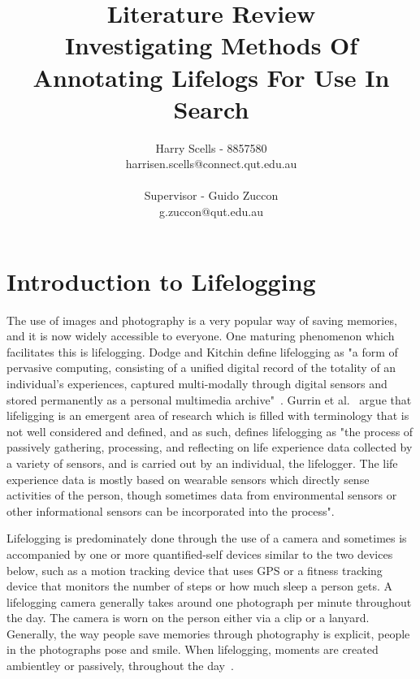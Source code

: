 \documentclass[12pt,a4paper]{article}
\begin{document}
\title{\small Literature Review\\\huge Investigating Methods Of Annotating Lifelogs For Use In Search}

\author{Harry Scells - 8857580\\harrisen.scells@connect.qut.edu.au\\\\\small Supervisor - Guido Zuccon\\\small g.zuccon@qut.edu.au\\}
\maketitle
\pagebreak
\tableofcontents
\pagebreak
\section{Introduction to Lifelogging}
The use of images and photography is a very popular way of saving memories, and it is now widely accessible to everyone. One maturing phenomenon which facilitates this is lifelogging. Dodge and Kitchin define lifelogging as "a form of pervasive computing, consisting of a unified digital record of the totality of  an individual's experiences, captured multi-modally through digital sensors and stored permanently as a personal multimedia archive"~\cite{dodge2007outlines}. Gurrin et al.~\cite{gurrin2014lifelogging} argue that lifeligging is an emergent area of research which is filled with terminology that is not well considered and defined, and as such, defines lifelogging as "the process of passively gathering, processing, and reflecting on life experience data collected by a variety of sensors, and is carried out by an individual, the lifelogger. The life experience data is mostly based on wearable sensors which directly sense activities of the person, though sometimes data from environmental sensors or other informational sensors can be incorporated into the process".

 Lifelogging is predominately done through the use of a camera and sometimes is accompanied by one or more quantified-self devices similar to the two devices below, such as a motion tracking device that uses GPS or a fitness tracking device that monitors the number of steps or how much sleep a person gets. A lifelogging camera generally takes around one photograph per minute throughout the day. The camera is worn on the person either via a clip or a lanyard. Generally, the way people save memories through photography is explicit, people in the photographs pose and smile. When lifelogging, moments are created ambientley or passively, throughout the day~\cite{gurrin2014lifelogging}.
\end{document}
